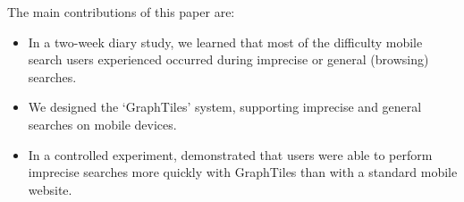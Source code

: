 The main contributions of this paper are:
\begin{itemize}
\item In a two-week diary study, we learned that most of the difficulty mobile search users experienced occurred during imprecise or general (browsing) searches.  
\item We designed the `GraphTiles' system, supporting imprecise and general searches on mobile devices.
\item In a controlled experiment, demonstrated that users were able to perform imprecise searches more quickly with GraphTiles than with a standard mobile website.
\end{itemize}



